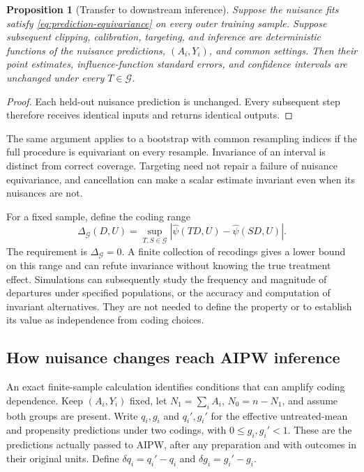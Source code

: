 \documentclass[11pt]{article}
\newtheorem{proposition}{Proposition}
\theoremstyle{definition}
\theoremstyle{remark}
\begin{document}
\begin{proposition}[Transfer to downstream inference]\label{prop:transfer}
Suppose the nuisance fits satisfy \eqref{eq:prediction-equivariance} on
every outer training sample. Suppose subsequent clipping, calibration,
targeting, and inference are deterministic functions of the nuisance
predictions, $(A_i,Y_i)$, and common settings. Then their point estimates,
influence-function standard errors, and confidence intervals are unchanged
under every $T\in\mathcal G$.
\end{proposition}
\begin{proof}
Each held-out nuisance prediction is unchanged. Every subsequent step
therefore receives identical inputs and returns identical outputs.
\end{proof}
The same argument applies to a bootstrap with common resampling indices if
the full procedure is equivariant on every resample. Invariance of an
interval is distinct from correct coverage. Targeting need not repair a
failure of nuisance equivariance, and cancellation can make a scalar
estimate invariant even when its nuisances are not.

For a fixed sample, define the coding range
\[
 \Delta_{\mathcal G}(D,U)=
 \sup_{T,S\in\mathcal G}|\widehat\psi(TD,U)-\widehat\psi(SD,U)|.
\]
The requirement is $\Delta_{\mathcal G}=0$. A finite collection of recodings
gives a lower bound on this range and can refute invariance without knowing
the true treatment effect. Simulations can subsequently study the frequency
and magnitude of departures under specified populations, or the accuracy
and computation of invariant alternatives. They are not needed to define
the property or to establish its value as independence from coding choices.

\subsection{How nuisance changes reach AIPW inference}

An exact finite-sample calculation identifies conditions that can amplify
coding dependence. Keep $(A_i,Y_i)$ fixed, let $N_1=\sum_i A_i$,
$N_0=n-N_1$, and assume both groups are present. Write $q_i,g_i$ and
$q_i',g_i'$ for the effective untreated-mean and propensity predictions
under two codings, with $0\le g_i,g_i'<1$. These are the predictions actually
passed to AIPW, after any preparation and with outcomes in their original
units. Define $\delta q_i=q_i'-q_i$ and $\delta g_i=g_i'-g_i$.
\end{document}
